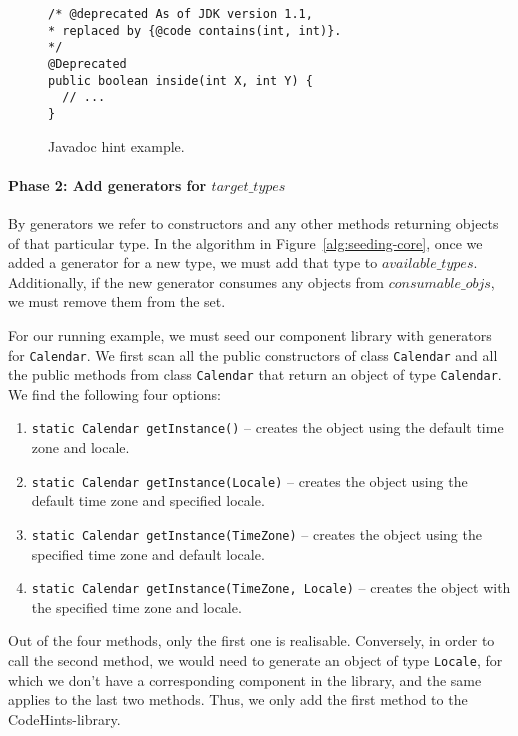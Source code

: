\documentclass[conference]{IEEEtran}
\newcommand{\consumableobjs}{\mbox{$\mathit{consumable\_objs}$}\xspace}
\newcommand{\availabletypes}{\mbox{$\mathit{available\_types}$}\xspace}
\newcommand{\targettypes}{\mbox{$\mathit{target\_types}$}\xspace}
\begin{document}
\begin{figure}
\begin{lstlisting}[mathescape=true,showstringspaces=false]
/* @deprecated As of JDK version 1.1,
* replaced by {@code contains(int, int)}.
*/
@Deprecated
public boolean inside(int X, int Y) {
  // ...
}
\end{lstlisting}
\caption{Javadoc hint example.}
\label{ex:javadoc-hint}
\end{figure}




\paragraph{{\bf Phase 2: Add generators for \targettypes}}

By generators we refer to constructors and any other methods returning
objects of that particular type.  In the algorithm in
Figure~\ref{alg:seeding-core}, once we added a generator for a new type, we
must add that type to \availabletypes.  Additionally, if the new generator
consumes any objects from \consumableobjs, we must remove them from the set.

For our running example, we must seed our component library with generators
for \lstinline[breaklines=true]{Calendar}.
%
We first scan all the public constructors of class
\lstinline[breaklines=true]{Calendar} and all the public methods from class
\lstinline[breaklines=true]{Calendar} that return an object of type
\lstinline[breaklines=true]{Calendar}.  We find the following four options:
%
\begin{enumerate}
  \item \lstinline[breaklines=true]{static Calendar getInstance()} -- creates the object using the default time zone and locale.
  \item \lstinline[breaklines=true]{static Calendar getInstance(Locale)} -- creates the object using the default time zone and specified locale.
  \item \lstinline[breaklines=true]{static Calendar getInstance(TimeZone)} -- creates the object using the specified time zone and default locale.
  \item \lstinline[breaklines=true]{static Calendar getInstance(TimeZone, Locale)} -- creates the object with the specified time zone and locale.
\end{enumerate}

Out of the four methods, only the first one is realisable.  Conversely, in
order to call the second method, we would need to generate an object of type
\lstinline[breaklines=true]{Locale}, for which we don't have a corresponding
component in the library, and the same applies to the last two methods.
Thus, we only add the first method to the CodeHints-library.
\end{document}
